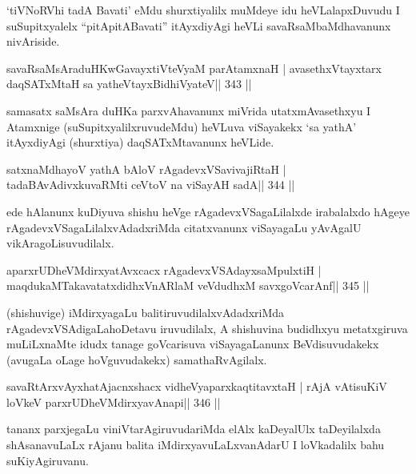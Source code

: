\begin{artha}
`tiVNoRVhi tadA Bavati' eMdu shurxtiyalilx muMdeye idu heVLalapxDuvudu I suSupitxyalelx ``pitA\s pitABavati'' itAyxdiyAgi heVLi savaRsaMbaMdhavanunx nivAriside.
\end{artha}

\begin{shl}
savaRsaMsAraduHKwGavayxtiVteVyaM parA\s\s tamxnaH |
avasethxVtayxtarx daqSATxMtaH sa yatheVtayxBidhiVyateV\hfill || 343 ||
\end{shl}

\begin{artha}
samasatx saMsAra duHKa parxvAhavanunx miVrida utatxmAvasethxyu I  Atamxnige (suSupitxyalilxruvudeMdu) heVLuva viSayakekx `sa yathA' itAyxdiyAgi (shurxtiya) daqSATxMtavanunx heVLide.
\end{artha}

\begin{shl}
satxnaMdhayoV yathA bAloV rAgadevxVSavivajiRtaH |
tadaBAvAdivxkuvaRMti ceVtoV na viSayAH sadA\hfill || 344 ||
\end{shl}

\begin{artha}
ede hAlanunx kuDiyuva shishu heVge rAgadevxVSagaLilalxde irabalalxdo hAgeye rAgadevxVSagaLilalxvAdadxriMda citatxvanunx viSayagaLu yAvAgalU vikAragoLisuvudilalx.
\end{artha}

\begin{shl}
aparxrUDheVMdirxyatAvxcacx rAgadevxVSAdayxsaMpulxtiH |
maqdukaMTakavatatxdidhxVnARlaM veVdudhxM savxgoVcarAnf\hfill || 345 ||
\end{shl}

\begin{artha}
(shishuvige) iMdirxyagaLu balitiruvudilalxvAdadxriMda rAgadevxVSAdigaLa\break hoDetavu iruvudilalx, A shishuvina budidhxyu metatxgiruva muLiLxnaMte idudx tanage goVcarisuva viSayagaLanunx BeVdisuvudakekx (avugaLa oLage hoVguvudakekx) samathaRvAgilalx.
\end{artha}


\begin{shl}
savaRtArxvAyxhatAjacnxshacx vidheVyaparxkaqtitavxtaH |
rAjA vA\s tisuKiV loVkeV parxrUDheVMdirxyavAnapi\hfill || 346 ||
\end{shl}

\begin{artha}
tananx parxjegaLu viniVtarAgiruvudariMda elAlx kaDeyalUlx taDeyilalxda shAsanavuLaLx rAjanu balita iMdirxyavuLaLxvanAdarU I loVkadalilx bahu suKiyAgiruvanu.
\end{artha}

